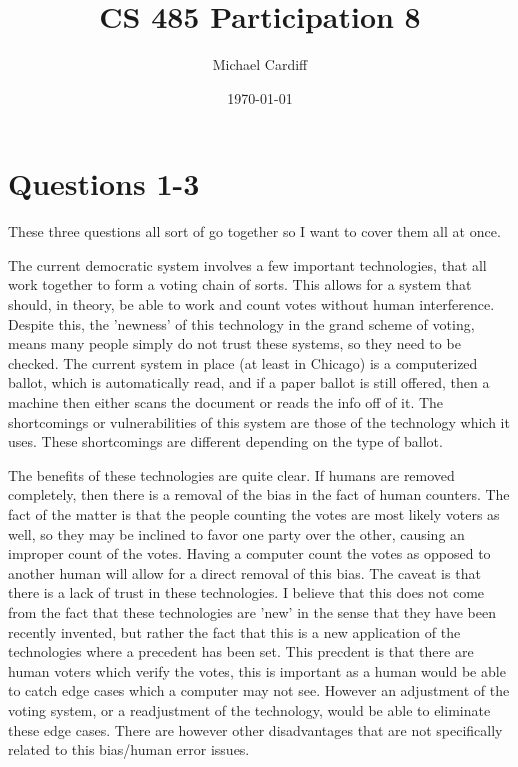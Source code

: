 \documentclass[12pt]{article}
\title{\vspace{-3em}CS 485 Participation 8}
\author{Michael Cardiff}
\date{\today}
\begin{document}
\maketitle
\section*{Questions 1-3}
These three questions all sort of go together so I want to cover them all at once.

The current democratic system involves a few important technologies, that all work together to form a voting chain of sorts. This allows for a system that should, in theory, be able to work and count votes without human interference. Despite this, the 'newness' of this technology in the grand scheme of voting, means many people simply do not trust these systems, so they need to be checked. The current system in place (at least in Chicago) is a computerized ballot, which is automatically read, and if a paper ballot is still offered, then a machine then either scans the document or reads the info off of it. The shortcomings or vulnerabilities of this system are those of the technology which it uses. These shortcomings are different depending on the type of ballot.

The benefits of these technologies are quite clear. If humans are removed completely, then there is a removal of the bias in the fact of human counters. The fact of the matter is that the people counting the votes are most likely voters as well, so they may be inclined to favor one party over the other, causing an improper count of the votes. Having a computer count the votes as opposed to another human will allow for a direct removal of this bias. The caveat is that there is a lack of trust in these technologies. I believe that this does not come from the fact that these technologies are 'new' in the sense that they have been recently invented, but rather the fact that this is a new application of the technologies where a precedent has been set. This precdent is that there are human voters which verify the votes, this is important as a human would be able to catch edge cases which a computer may not see. However an adjustment of the voting system, or a readjustment of the technology, would be able to eliminate these edge cases. There are however other disadvantages that are not specifically related to this bias/human error issues.
\end{document}
